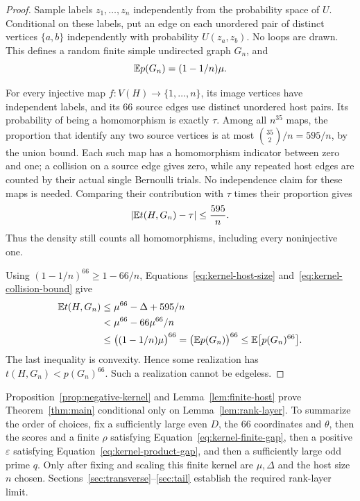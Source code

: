 \begin{proof}
Sample labels $z_1,\ldots,z_n$ independently from the probability
space of $U$. Conditional on these labels, put an edge on each
unordered pair of distinct vertices $\{a,b\}$ independently with
probability $U(z_a,z_b)$. No loops are drawn. This defines a random
finite simple undirected graph $G_n$, and
\begin{equation}
 \mathbb E p(G_n)=(1-1/n)\mu.
 \label{eq:kernel-host-mean}
\end{equation}

For every injective map $f:V(H)\to\{1,\ldots,n\}$, its image
vertices have independent labels, and its $66$ source edges use
distinct unordered host pairs. Its probability of being a
homomorphism is exactly $\tau$. Among all $n^{35}$ maps, the
proportion that identify any two source vertices is at most
$\binom{35}{2}/n=595/n$, by the union bound. Each such map has a
homomorphism indicator between zero and one; a collision on a
source edge gives zero, while any repeated host edges are counted
by their actual single Bernoulli trials. No independence claim for
these maps is needed. Comparing their contribution with $\tau$
times their proportion gives
\begin{equation}
 |\mathbb E t(H,G_n)-\tau|\le\frac{595}{n}.
 \label{eq:kernel-collision-bound}
\end{equation}
Thus the density still counts all homomorphisms, including every
noninjective one.

Using $(1-1/n)^{66}\ge1-66/n$, Equations~\eqref{eq:kernel-host-size}
and~\eqref{eq:kernel-collision-bound} give
\begin{align*}
 \mathbb E t(H,G_n)
 &\le\mu^{66}-\Delta+595/n\\
 &<\mu^{66}-66\mu^{66}/n\\
 &\le\bigl((1-1/n)\mu\bigr)^{66}
   =\bigl(\mathbb E p(G_n)\bigr)^{66}
   \le\mathbb E\bigl[p(G_n)^{66}\bigr].
\end{align*}
The last inequality is convexity. Hence some realization has
$t(H,G_n)<p(G_n)^{66}$. Such a realization cannot be edgeless.
\end{proof}

Proposition~\ref{prop:negative-kernel} and Lemma~\ref{lem:finite-host}
prove Theorem~\ref{thm:main} conditional only on
Lemma~\ref{lem:rank-layer}. To summarize the order of choices, fix a
sufficiently large even $D$, the $66$ coordinates and $\theta$, then
the scores and a finite $\rho$ satisfying Equation~\eqref{eq:kernel-finite-gap},
then a positive $\varepsilon$ satisfying
Equation~\eqref{eq:kernel-product-gap}, and then a sufficiently large
odd prime $q$. Only after fixing and scaling this finite kernel are
$\mu,\Delta$ and the host size $n$ chosen.
Sections~\ref{sec:transverse}--\ref{sec:tail} establish the required
rank-layer limit.
